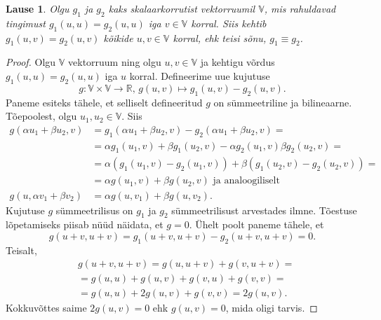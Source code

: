 \documentclass[a4paper,12pt]{article}
\theoremstyle{plain}
\newtheorem{lause}{Lause}[section]
\theoremstyle{definition}
\numberwithin{equation}{section}
\begin{document}
\begin{lause} \label{lause:skalaarkorrutise-yhesus}
Olgu $g_1$ ja $g_2$ kaks skalaarkorrutist vektorruumil $\mathbb{V}$, mis rahuldavad tingimust $g_1 \left(u, u \right) = g_2 \left(u, u \right)$ iga $v \in \mathbb{V}$ korral. Siis kehtib $g_1 \left(u, v \right) = g_2 \left(u, v \right)$ kõikide $u, v \in \mathbb{V}$ korral, ehk teisi sõnu, $g_1 \equiv g_2$.
\end{lause}

\begin{proof}
Olgu $\mathbb{V}$ vektorruum ning olgu $u, v \in \mathbb{V}$ ja kehtigu võrdus $g_1 \left(u, u\right) = g_2 \left(u, u\right)$ iga $u$ korral. Defineerime uue kujutuse
\begin{equation*}
g: \mathbb{V} \times \mathbb{V} \rightarrow \mathbb{R} \text{, } g\left(u, v\right) \mapsto g_1\left(u, v\right) - g_2\left(u, v\right).
\end{equation*}
Paneme esiteks tähele, et selliselt defineeritud $g$ on sümmeetriline ja bilineaarne. Tõepoolest, olgu $u_1, u_2 \in \mathbb{V}$. Siis
\begin{align*}
g\left( \alpha u_1 + \beta u_2, v \right) &= g_1\left( \alpha u_1 + \beta u_2, v \right) - g_2\left( \alpha u_1 + \beta u_2, v \right) = \\
&= \alpha g_1 \left(u_1, v\right) + \beta g_1 \left(u_2, v \right) -\alpha g_2 \left(u_1, v\right)  \beta g_2 \left(u_2, v \right) = \\
&= \alpha \left( g_1 \left(u_1, v\right) - g_2 \left(u_1, v \right)\right) + \beta \left( g_1 \left(u_2, v\right) - g_2 \left(u_2, v \right)\right) = \\
&= \alpha g\left( u_1, v \right) + \beta g\left( u_2, v\right) \text{ ja analoogiliselt} \\
g\left( u, \alpha v_1 + \beta v_2 \right) &= \alpha g\left( u, v_1 \right) + \beta g\left( u, v_2\right).
\end{align*}
Kujutuse $g$ sümmeetrilisus on $g_1$ ja $g_2$ sümmeetrilisust arvestades ilmne. Tõestuse lõpetamiseks piisab nüüd näidata, et $g = 0$. Ühelt poolt paneme tähele, et
\begin{equation*}
g \left(u+v, u+v\right) = g_1 \left(u+v, u+v\right) - g_2 \left(u+v, u+v\right) = 0.
\end{equation*}
Teisalt,
\begin{align*}
& g \left(u+v, u+v\right) = g \left(u, u+v\right) + g \left(v, u+v\right) = \\
&= g \left(u, u\right) + g \left(u, v\right) + g \left(v, u\right) + g \left(v, v\right) = \\
&= g \left(u, u\right) + 2g \left(u, v\right) + g \left(v, v\right) = 2g \left(u, v\right).
\end{align*}
Kokkuvõttes saime $2g\left(u, v\right) = 0$ ehk $g\left(u, v\right) = 0$, mida oligi tarvis.
\end{proof}
\end{document}
